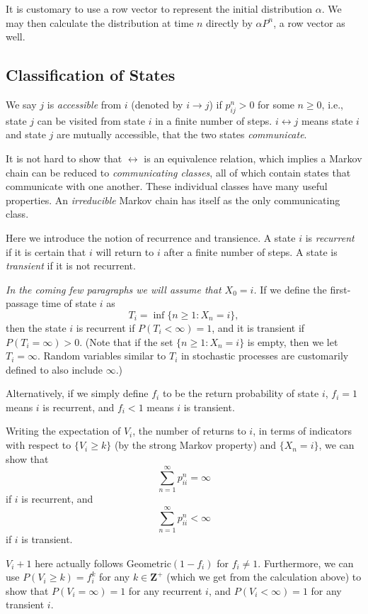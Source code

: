 \documentclass[11pt]{article}
\newcommand{\Z}{\mathbf{Z}}
\begin{document}
It is customary to use a row vector to represent the initial distribution $\alpha $. We may then calculate the distribution at time $n$ directly by $\alpha P^{n}$, a row vector as well.

\subsection{Classification of States}
We say $j$ is \textit{accessible} from $i$ (denoted by $i\rightarrow j$) if $p_{ij}^{n}>0$ for some $n\geq 0$, i.e., state $j$ can be visited from state $i$ in a finite number of steps. $i \leftrightarrow j$ means state $i$ and state $j$ are mutually accessible, that the two states \textit{communicate}.

It is not hard to show that $\leftrightarrow$ is an equivalence relation, which implies a Markov chain can be reduced to \textit{communicating classes}, all of which contain states that communicate with one another. These individual classes have many useful properties. An \textit{irreducible} Markov chain has itself as the only communicating class.

Here we introduce the notion of recurrence and transience. A state $i$ is \textit{recurrent} if it is certain that $i$ will return to $i$ after a finite number of steps. A state is \textit{transient} if it is not recurrent.

\emph{In the coming few paragraphs we will assume that $X_0 = i$.} If we define the first-passage time of state $i$ as
\[
T_{i}=\inf \{n\geq 1:X_{n}=i\},
\]
then the state $i$ is recurrent if $P(T_{i}<\infty )=1$, and it is transient if $P(T_{i}=\infty )>0$. (Note that if the set $\{n\geq 1:X_{n}=i\}$ is empty, then we let $T_{i}=\infty $. Random variables similar to $T_{i}$ in stochastic processes are customarily defined to also include $\infty $.)

Alternatively, if we simply define $f_{i}$ to be the return probability of state $i$, $f_{i}=1$ means $i$ is recurrent, and $f_{i}<1$ means $i$ is transient.

Writing the expectation of $V_{i}$, the number of returns to $i$, in terms of indicators with respect to $\{V_{i}\geq k\}$ (by the strong Markov property) and $\{X_{n}=i\}$, we can show that
\[
\sum_{n=1}^{\infty }p_{ii}^{n}=\infty 
\]
if $i$ is recurrent, and
\[
\sum_{n=1}^{\infty }p_{ii}^{n}<\infty 
\]
if $i$ is transient.

\noindent {} $V_{i}+1$ here actually follows Geometric$(1- f_{i})$ for $f_{i}\neq 1$. Furthermore, we can use $P(V_{i}\geq k)=f_{i}^{k}$ for any $k\in \Z^+$ (which we get from the calculation above) to show that $P(V_{i}=\infty )=1$ for any recurrent $i$, and $P(V_{i}<\infty )=1$ for any transient $i$.
\end{document}
